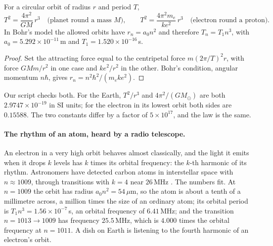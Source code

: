\begin{proposition}\label{prop:18kepler}
For a circular orbit of radius $r$ and period $T$,
\[
  T^{2}=\frac{4\pi^{2}}{GM}\,r^{3}\quad\text{(planet round a mass $M$)},\qquad
  T^{2}=\frac{4\pi^{2}m_e}{k e^{2}}\,r^{3}\quad\text{(electron round a proton)}.
\]
In Bohr's model the allowed orbits have $r_n=a_0n^{2}$ and therefore $T_n=T_1n^{3}$, with
$a_0=5.292\times10^{-11}$\,m and $T_1=1.520\times10^{-16}$\,s.
\end{proposition}

\begin{proof}
Set the attracting force equal to the centripetal force $m(2\pi/T)^{2}r$, with force $GMm/r^{2}$ in one
case and $ke^{2}/r^{2}$ in the other. Bohr's condition, angular momentum $n\hbar$, gives
$r_n=n^{2}\hbar^{2}/(m_eke^{2})$.
\end{proof}

Our script checks both. For the Earth, $T^{2}/r^{3}$ and $4\pi^{2}/(GM_\odot)$ are both
$2.9747\times10^{-19}$ in SI units; for the electron in its lowest orbit both sides are $0.15588$. The two
constants differ by a factor of $5\times10^{17}$, and the law is the same.

\paragraph{The rhythm of an atom, heard by a radio telescope.} An electron in a very high orbit behaves
almost classically, and the light it emits when it drops $k$ levels has $k$ times its orbital frequency:
the $k$-th harmonic of its rhythm. Astronomers have detected carbon atoms in interstellar space with
$n\approx1009$, through transitions with $k=4$ near $26$\,MHz \cite{stepkin2007}. The numbers fit. At
$n=1009$ the orbit has radius $a_0n^{2}=54\,\mu$m, so the atom is about a tenth of a millimetre across,
a million times the size of an ordinary atom; its orbital period is $T_1n^{3}=1.56\times10^{-7}$\,s, an
orbital frequency of $6.41$\,MHz; and the transition $n=1013\to1009$ has frequency $25.5$\,MHz, which is
$4.000$ times the orbital frequency at $n=1011$. A dish on Earth is listening to the fourth harmonic of
an electron's orbit.

